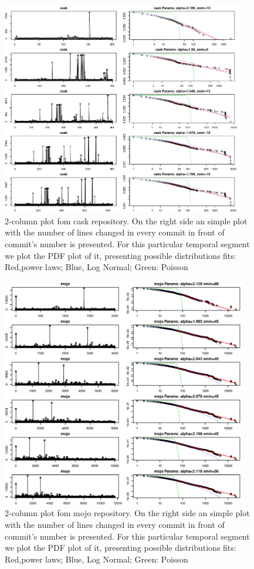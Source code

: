 \documentclass[conference]{IEEEtran}
\begin{document}
\begin{figure}[htbp]
	\centerline{\includegraphics[width=0.95\textwidth]{img/adjusted_dist_cask.png}}
	\caption{2-column plot fom cask repository. On the right side an simple plot with the number of lines changed in every commit in front of commit's number is presented. For this particular temporal segment we plot the PDF plot of it, presenting possible distributions fits: Red,power laws; Blue, Log Normal; Green: Poisson}
	\label{fig:cask}
      \end{figure}

     
\begin{figure}[htbp]
	\centerline{\includegraphics[width=0.95\textwidth]{img/mojo_global_estimation.eps}}
	\caption{2-column plot fom mojo repository. On the right side an simple plot with the number of lines changed in every commit in front of commit's number is presented. For this particular temporal segment we plot the PDF plot of it, presenting possible distributions fits: Red,power laws; Blue, Log Normal; Green: Poisson}
	\label{fig:mojo}
      \end{figure}
\end{document}

